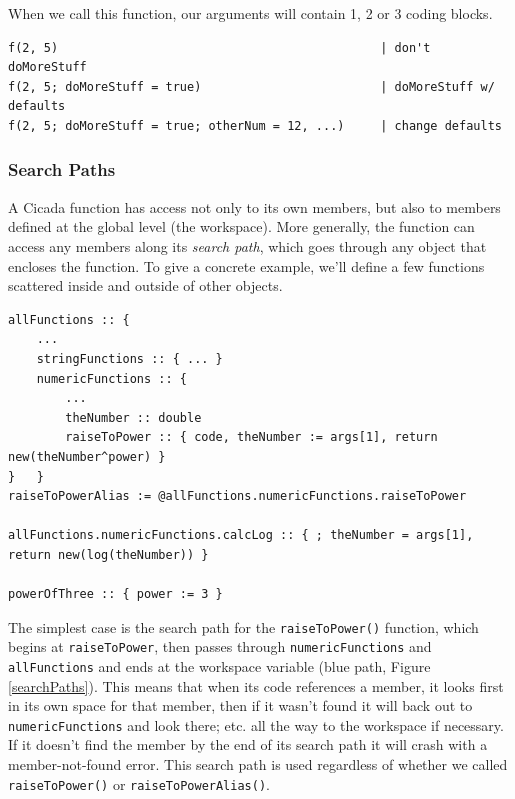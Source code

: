 \documentclass{article}
\newenvironment{code}{
       \begin{list}{}{
               \setlength{\leftmargin}{.4in}
               \setlength{\rightmargin}{0in}
               \setlength{\topsep}{.2in}
       }
       \small
       \item[] }
       { \end{list}   }
\begin{document}
\noindent When we call this function, our arguments will contain 1, 2 or 3 coding blocks.

\begin{code} \begin{verbatim}
f(2, 5)                                             | don't doMoreStuff
f(2, 5; doMoreStuff = true)                         | doMoreStuff w/ defaults
f(2, 5; doMoreStuff = true; otherNum = 12, ...)     | change defaults
\end{verbatim} \end{code}






\subsubsection{Search Paths} 

A Cicada function has access not only to its own members, but also to members defined at the global level (the workspace).  More generally, the function can access any members along its \emph{search path}, which goes through any object that encloses the function.  To give a concrete example, we'll define a few functions scattered inside and outside of other objects.

\begin{code} \begin{verbatim}
allFunctions :: {
    ...
    stringFunctions :: { ... }
    numericFunctions :: {
        ...
        theNumber :: double
        raiseToPower :: { code, theNumber := args[1], return new(theNumber^power) }
}   }
raiseToPowerAlias := @allFunctions.numericFunctions.raiseToPower

allFunctions.numericFunctions.calcLog :: { ; theNumber = args[1], return new(log(theNumber)) }

powerOfThree :: { power := 3 }
\end{verbatim} \end{code}

\noindent The simplest case is the search path for the \verb#raiseToPower()# function, which begins at \verb#raiseToPower#, then passes through \verb#numericFunctions# and \verb#allFunctions# and ends at the workspace variable (blue path, Figure \ref{searchPaths}).  This means that when its code references a member, it looks first in its own space for that member, then if it wasn't found it will back out to \verb#numericFunctions# and look there; etc. all the way to the workspace if necessary.  If it doesn't find the member by the end of its search path it will crash with a member-not-found error.  This search path is used regardless of whether we called \verb#raiseToPower()# or \verb#raiseToPowerAlias()#.
\end{document}
